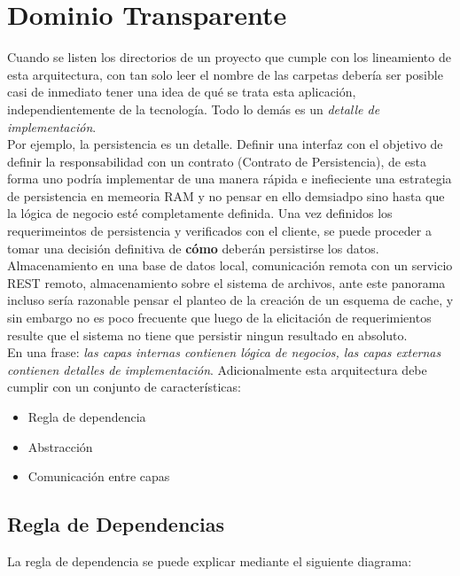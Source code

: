\section{Dominio Transparente}
Cuando se listen los directorios de un proyecto que cumple con los lineamiento de esta arquitectura, con tan solo leer el nombre de las carpetas debería ser posible casi de inmediato tener una idea de qué se trata esta aplicación, independientemente de la tecnología. Todo lo demás es un \emph{detalle de implementación}. \\
Por ejemplo, la persistencia es un detalle. Definir una interfaz con el objetivo de definir la responsabilidad con un contrato (Contrato de Persistencia),  de esta forma uno podría implementar de una manera rápida e inefieciente una estrategia de persistencia en memeoria RAM y no pensar en ello demsiadpo sino hasta que la lógica de negocio esté completamente definida. Una vez definidos los requerimeintos de persistencia y verificados con el cliente, se puede proceder a tomar una decisión definitiva de \textbf{cómo} deberán persistirse los datos.\\ 
Almacenamiento en una base de datos local, comunicación remota con un servicio REST remoto, almacenamiento sobre el sistema de archivos, ante este panorama incluso sería razonable pensar el planteo de la creación de un esquema de cache, y sin embargo no es poco frecuente que luego de la elicitación de requerimientos resulte que el sistema no tiene que persistir ningun resultado en absoluto.\\ 
En una frase: \textit{las capas internas contienen lógica de negocios, las capas externas contienen detalles de implementación}.
Adicionalmente esta arquitectura debe cumplir con un conjunto de características:

\begin{itemize}
	\item Regla de dependencia
	\item Abstracción
	\item Comunicación entre capas
\end{itemize}

\subsection{Regla de Dependencias}
La regla de dependencia se puede explicar mediante el siguiente diagrama:

